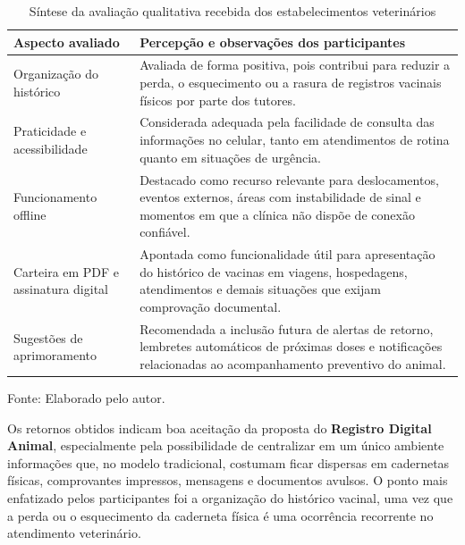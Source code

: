 \begin{table}[htbp]
\centering
\caption{Síntese da avaliação qualitativa recebida dos estabelecimentos veterinários}
\label{tab:resumo_qualitativo}
\par\vspace{4pt}
\small
\setlength{\tabcolsep}{5pt}
\renewcommand{\arraystretch}{1.15}
\begin{tabular}{@{}p{} p{}@{}}
\hline
\textbf{Aspecto avaliado} & \textbf{Percepção e observações dos participantes} \\
\hline
Organização do histórico & Avaliada de forma positiva, pois contribui para reduzir a perda, o esquecimento ou a rasura de registros vacinais físicos por parte dos tutores. \\
Praticidade e acessibilidade & Considerada adequada pela facilidade de consulta das informações no celular, tanto em atendimentos de rotina quanto em situações de urgência. \\
Funcionamento offline & Destacado como recurso relevante para deslocamentos, eventos externos, áreas com instabilidade de sinal e momentos em que a clínica não dispõe de conexão confiável. \\
Carteira em PDF e assinatura digital & Apontada como funcionalidade útil para apresentação do histórico de vacinas em viagens, hospedagens, atendimentos e demais situações que exijam comprovação documental. \\
Sugestões de aprimoramento & Recomendada a inclusão futura de alertas de retorno, lembretes automáticos de próximas doses e notificações relacionadas ao acompanhamento preventivo do animal. \\
\hline
\end{tabular}
\par\vspace{2pt}
\begin{minipage}{\linewidth}
\footnotesize\raggedright
Fonte: Elaborado pelo autor.
\end{minipage}
\end{table}

Os retornos obtidos indicam boa aceitação da proposta do \textbf{Registro Digital Animal}, especialmente pela possibilidade de centralizar em um único ambiente informações que, no modelo tradicional, costumam ficar dispersas em cadernetas físicas, comprovantes impressos, mensagens e documentos avulsos. O ponto mais enfatizado pelos participantes foi a organização do histórico vacinal, uma vez que a perda ou o esquecimento da caderneta física é uma ocorrência recorrente no atendimento veterinário.

